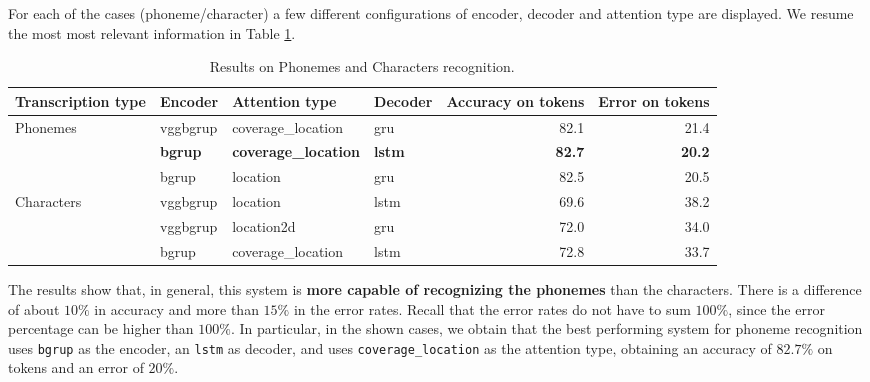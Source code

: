 \documentclass[a4paper]{article}
\def\inline{\lstinline[basicstyle=\ttfamily,keywordstyle={}]}
\begin{document}
\begin{itemize}
        For each of the cases (phoneme/character) a few different configurations of encoder, decoder and attention type are displayed. We resume the most most relevant information in Table \ref{table:results:1}.
        \begin{table}[H]
          \begin{tabular}{l|lllrr}
            Transcription type & Encoder        & Attention type              & Decoder       & \multicolumn{1}{l}{Accuracy on tokens} & \multicolumn{1}{l}{Error on tokens} \\ \hline
            Phonemes           & vggbgrup       & coverage\_location          & gru           & 82.1                                   & 21.4                                \\
                               & \textbf{bgrup} & \textbf{coverage\_location} & \textbf{lstm} & \textbf{82.7}                          & \textbf{20.2}                       \\
                               & bgrup          & location                    & gru           & 82.5                                   & 20.5                                \\
            Characters         & vggbgrup       & location                    & lstm          & 69.6                                   & 38.2                                \\
                               & vggbgrup       & location2d                  & gru           & 72.0                                   & 34.0                                \\
                               & bgrup          & coverage\_location          & lstm          & 72.8                                   & 33.7
          \end{tabular}
          \caption{Results on Phonemes and Characters recognition.}

          \label{table:results:1}
        \end{table}
        The results show that, in general, this system is \textbf{more capable of recognizing the phonemes} than the characters. There is a difference of about \(10\%\) in accuracy and more than \(15\%\) in the error rates. Recall that the error rates do not have to sum \(100\%\), since the error percentage can be higher than \(100\%\). In particular, in the shown cases, we obtain that the best performing system for phoneme recognition uses \inline{bgrup} as the encoder, an \inline{lstm} as decoder, and uses \inline{coverage_location} as the attention type, obtaining an accuracy of \(82.7\%\) on tokens and an error of \(20\%\).
\end{itemize}
\end{document}

